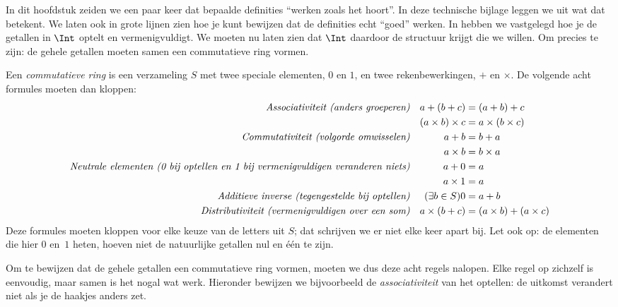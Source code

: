 \documentclass[openany]{memoir}
\begin{document}
	
In dit hoofdstuk zeiden we een paar keer dat bepaalde definities
``werken zoals het hoort''. In deze technische bijlage leggen we uit
wat dat betekent. We laten ook in grote lijnen zien hoe je kunt
bewijzen dat de definities echt ``goed'' werken.
In  hebben we vastgelegd hoe je de getallen in $\Int$
optelt en vermenigvuldigt. We moeten nu laten zien dat $\Int$ daardoor
de structuur krijgt die we willen. Om precies te zijn: de gehele
getallen moeten samen een commutatieve ring vormen.
\begin{defn}
	Een \emph{commutatieve ring} is een verzameling $S$ met twee speciale elementen, $0$ en $1$, en twee rekenbewerkingen, $+$ en $\times$. De volgende acht formules moeten dan kloppen:
	\begin{align*}
		\emph{Associativiteit (anders groeperen)}&&a + (b+ c) & = (a + b) + c \\
		&& (a \times b) \times c & = a \times (b\times c)\\
		\emph{Commutativiteit (volgorde omwisselen)}&&a + b &= b+ a  \\
		&&  a \times b&= b\times a\\ 
		\emph{Neutrale elementen (0 bij optellen en 1 bij vermenigvuldigen veranderen niets)}&&a + 0 &= a \\
		&& a \times 1 &= a\\
		\emph{Additieve inverse (tegengestelde bij optellen)}&&(\exists b\in S)0&=a + b\\
		\emph{Distributiviteit (vermenigvuldigen over een som)}&&a \times (b+ c ) &= (a \times b) + (a \times c)
	\end{align*}
	Deze formules moeten kloppen voor elke keuze van de letters uit $S$; dat schrijven we er niet elke keer apart bij. Let ook op: de elementen die hier $0$ en~$1$ heten, hoeven niet de natuurlijke getallen nul en één te zijn.
\end{defn}
Om te bewijzen dat de gehele getallen een commutatieve ring vormen,
moeten we dus deze acht regels nalopen. Elke regel op zichzelf is
eenvoudig, maar samen is het nogal wat werk. Hieronder bewijzen we
bijvoorbeeld de \emph{associativiteit} van het optellen: de uitkomst
verandert niet als je de haakjes anders zet.
\end{document}
